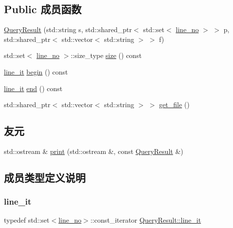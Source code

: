 \subsection*{Public 成员函数}
\begin{DoxyCompactItemize}
\item 
\hyperlink{classQueryResult_a9712669ad32f23c0875c1a2b4dc55ef2}{Query\+Result} (std\+::string s, std\+::shared\+\_\+ptr$<$ std\+::set$<$ \hyperlink{classQueryResult_a34e6c64fb173f43499443469009c262f}{line\+\_\+no} $>$ $>$ p, std\+::shared\+\_\+ptr$<$ std\+::vector$<$ std\+::string $>$ $>$ f)
\item 
std\+::set$<$ \hyperlink{classQueryResult_a34e6c64fb173f43499443469009c262f}{line\+\_\+no} $>$\+::size\+\_\+type \hyperlink{classQueryResult_af4d3e42b7cf43c88783069d484796052}{size} () const
\item 
\hyperlink{classQueryResult_a863424dfa74a1048fdcb636a98aea670}{line\+\_\+it} \hyperlink{classQueryResult_ac78944666adea9b2443e66bea6546857}{begin} () const
\item 
\hyperlink{classQueryResult_a863424dfa74a1048fdcb636a98aea670}{line\+\_\+it} \hyperlink{classQueryResult_a5ba21e424a2db6b4e91bc0079b165b70}{end} () const
\item 
std\+::shared\+\_\+ptr$<$ std\+::vector$<$ std\+::string $>$ $>$ \hyperlink{classQueryResult_af9b8d280bfe034dd1f7046036a98df93}{get\+\_\+file} ()
\end{DoxyCompactItemize}
\subsection*{友元}
\begin{DoxyCompactItemize}
\item 
std\+::ostream \& \hyperlink{classQueryResult_ab20f9885050aa16c68eaeff6f8d9db7d}{print} (std\+::ostream \&, const \hyperlink{classQueryResult}{Query\+Result} \&)
\end{DoxyCompactItemize}


\subsection{成员类型定义说明}
\mbox{\label{classQueryResult_a863424dfa74a1048fdcb636a98aea670}} 
\subsubsection{\texorpdfstring{line\+\_\+it}{line\_it}}
{\footnotesize\ttfamily typedef std\+::set$<$\hyperlink{classQueryResult_a34e6c64fb173f43499443469009c262f}{line\+\_\+no}$>$\+::const\+\_\+iterator \hyperlink{classQueryResult_a863424dfa74a1048fdcb636a98aea670}{Query\+Result\+::line\+\_\+it}}

